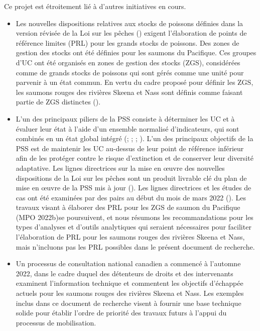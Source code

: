 \documentclass[french,11pt]{book}
\begin{document}
Ce projet est étroitement lié à d'autres initiatives en cours.
\begin{itemize}

\item
  Les nouvelles dispositions relatives aux stocks de poissons définies dans la version révisée de la Loi sur les pêches () exigent l'élaboration de points de référence limites (PRL) pour les grands stocks de poissons. Des zones de gestion des stocks ont été définies pour les saumons du Pacifique. Ces groupes d'UC ont été organisés en zones de gestion des stocks (ZGS), considérées comme de grands stocks de poissons qui sont gérés comme une unité pour parvenir à un état commun. En vertu du cadre proposé pour définir les ZGS, les saumons rouges des rivières Skeena et Nass sont définis comme faisant partie de ZGS distinctes ().
\item
  L'un des principaux piliers de la PSS consiste à déterminer les UC et à évaluer leur état à l'aide d'un ensemble normalisé d'indicateurs, qui sont combinés en un état global intégré (; ; ; ). L'un des principaux objectifs de la PSS est de maintenir les UC au-dessus de leur point de référence inférieur afin de les protéger contre le risque d'extinction et de conserver leur diversité adaptative. Les lignes directrices sur la mise en œuvre des nouvelles dispositions de la Loi sur les pêches sont un produit livrable clé du plan de mise en œuvre de la PSS mis à jour (). Les lignes directrices et les études de cas ont été examinées par des pairs au début du mois de mars 2022 (). Les travaux visant à élaborer des PRL pour les ZGS de saumon du Pacifique (MPO 2022b)se poursuivent, et nous résumons les recommandations pour les types d'analyses et d'outils analytiques qui seraient nécessaires pour faciliter l'élaboration de PRL pour les saumons rouges des rivières Skeena et Nass, mais n'incluons pas les PRL possibles dans le présent document de recherche.
\item
  Un processus de consultation national canadien a commencé à l'automne 2022, dans le cadre duquel des détenteurs de droits et des intervenants examinent l'information technique et commentent les objectifs d'échappée actuels pour les saumons rouges des rivières Skeena et Nass. Les exemples inclus dans ce document de recherche visent à fournir une base technique solide pour établir l'ordre de priorité des travaux futurs à l'appui du processus de mobilisation.
\end{itemize}
\end{document}
